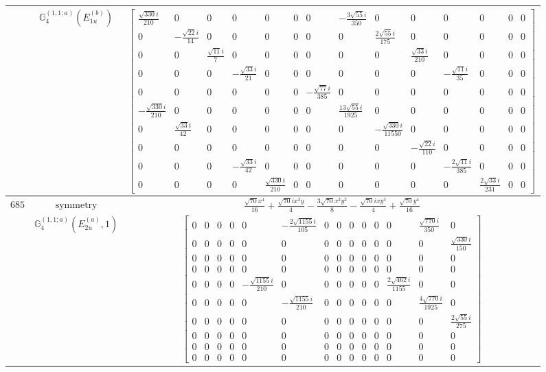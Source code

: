 \documentclass[fleqn,8pt,landscape]{jsarticle}
\begin{document}
\begin{longtable}{ccc}
$  $ & $ \mathbb{G}_{4}^{(1,1;a)}(E_{1u}^{(b)}) $ & $ \begin{bmatrix} \frac{\sqrt{330} i}{210} & 0 & 0 & 0 & 0 & 0 & 0 & - \frac{3 \sqrt{55} i}{350} & 0 & 0 & 0 & 0 & 0 & 0 \\ 0 & - \frac{\sqrt{22} i}{14} & 0 & 0 & 0 & 0 & 0 & 0 & \frac{2 \sqrt{55} i}{175} & 0 & 0 & 0 & 0 & 0 \\ 0 & 0 & \frac{\sqrt{11} i}{7} & 0 & 0 & 0 & 0 & 0 & 0 & \frac{\sqrt{33} i}{210} & 0 & 0 & 0 & 0 \\ 0 & 0 & 0 & - \frac{\sqrt{33} i}{21} & 0 & 0 & 0 & 0 & 0 & 0 & - \frac{\sqrt{11} i}{35} & 0 & 0 & 0 \\ 0 & 0 & 0 & 0 & 0 & 0 & - \frac{\sqrt{77} i}{385} & 0 & 0 & 0 & 0 & 0 & 0 & 0 \\ - \frac{\sqrt{330} i}{210} & 0 & 0 & 0 & 0 & 0 & 0 & \frac{13 \sqrt{55} i}{1925} & 0 & 0 & 0 & 0 & 0 & 0 \\ 0 & \frac{\sqrt{33} i}{42} & 0 & 0 & 0 & 0 & 0 & 0 & - \frac{\sqrt{330} i}{11550} & 0 & 0 & 0 & 0 & 0 \\ 0 & 0 & 0 & 0 & 0 & 0 & 0 & 0 & 0 & - \frac{\sqrt{22} i}{110} & 0 & 0 & 0 & 0 \\ 0 & 0 & 0 & - \frac{\sqrt{33} i}{42} & 0 & 0 & 0 & 0 & 0 & 0 & - \frac{2 \sqrt{11} i}{385} & 0 & 0 & 0 \\ 0 & 0 & 0 & 0 & \frac{\sqrt{330} i}{210} & 0 & 0 & 0 & 0 & 0 & 0 & \frac{2 \sqrt{33} i}{231} & 0 & 0 \end{bmatrix} $ \\ \hline
$ 685 $ & $ \text{symmetry} $ & $ \frac{\sqrt{70} x^{4}}{16} + \frac{\sqrt{70} i x^{3} y}{4} - \frac{3 \sqrt{70} x^{2} y^{2}}{8} - \frac{\sqrt{70} i x y^{3}}{4} + \frac{\sqrt{70} y^{4}}{16} $ \\
$  $ & $ \mathbb{G}_{4}^{(1,1;a)}(E_{2u}^{(a)},1) $ & $ \begin{bmatrix} 0 & 0 & 0 & 0 & 0 & - \frac{2 \sqrt{1155} i}{105} & 0 & 0 & 0 & 0 & 0 & 0 & \frac{\sqrt{770} i}{350} & 0 \\ 0 & 0 & 0 & 0 & 0 & 0 & 0 & 0 & 0 & 0 & 0 & 0 & 0 & \frac{\sqrt{330} i}{150} \\ 0 & 0 & 0 & 0 & 0 & 0 & 0 & 0 & 0 & 0 & 0 & 0 & 0 & 0 \\ 0 & 0 & 0 & 0 & 0 & 0 & 0 & 0 & 0 & 0 & 0 & 0 & 0 & 0 \\ 0 & 0 & 0 & 0 & - \frac{\sqrt{1155} i}{210} & 0 & 0 & 0 & 0 & 0 & 0 & \frac{2 \sqrt{462} i}{1155} & 0 & 0 \\ 0 & 0 & 0 & 0 & 0 & - \frac{\sqrt{1155} i}{210} & 0 & 0 & 0 & 0 & 0 & 0 & \frac{4 \sqrt{770} i}{1925} & 0 \\ 0 & 0 & 0 & 0 & 0 & 0 & 0 & 0 & 0 & 0 & 0 & 0 & 0 & \frac{2 \sqrt{55} i}{275} \\ 0 & 0 & 0 & 0 & 0 & 0 & 0 & 0 & 0 & 0 & 0 & 0 & 0 & 0 \\ 0 & 0 & 0 & 0 & 0 & 0 & 0 & 0 & 0 & 0 & 0 & 0 & 0 & 0 \\ 0 & 0 & 0 & 0 & 0 & 0 & 0 & 0 & 0 & 0 & 0 & 0 & 0 & 0 \end{bmatrix} $ \\ \hline

\end{longtable}
\end{document}
